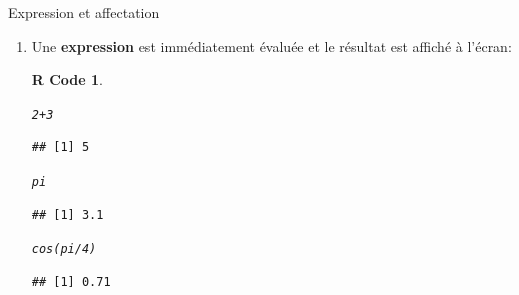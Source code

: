 \documentclass[11pt]{beamer}\usepackage[]{graphicx}\usepackage[]{color}
\makeatletter
\newcommand{\hlnum}[1]{\textcolor[rgb]{0.063,0.58,0.627}{#1}}%
\newcommand{\hlopt}[1]{\textcolor[rgb]{0.196,0.196,0.196}{#1}}%
\newcommand{\hlstd}[1]{\textcolor[rgb]{0.196,0.196,0.196}{#1}}%
\newcommand{\hlkwd}[1]{\textcolor[rgb]{0.78,0.227,0.412}{#1}}%
\newenvironment{kframe}{%
 \def\at@end@of@kframe{}%
 \ifinner\ifhmode%
  \def\at@end@of@kframe{\end{minipage}}%
  \begin{minipage}{\columnwidth}%
 \fi\fi%
 \def\FrameCommand##1{\hskip\@totalleftmargin \hskip-\fboxsep
 \colorbox{shadecolor}{##1}\hskip-\fboxsep
     \hskip-\linewidth \hskip-\@totalleftmargin \hskip\columnwidth}%
 \MakeFramed {\advance\hsize-\width
   \@totalleftmargin\z@ \linewidth\hsize
   \@setminipage}}%
 {\par\unskip\endMakeFramed%
 \at@end@of@kframe}
\newenvironment{knitrout}{}{} %
\newtheorem{rcode}{R Code}[section]
\newcounter{saveenumi}
\newcommand{\seti}{\setcounter{saveenumi}{\value{enumi}}}
\makeatother
\begin{document}
\begin{frame}[fragile]{Expression et affectation} 
\begin{enumerate}
\item Une \textbf{expression} est immédiatement évaluée et le résultat est affiché à l’écran:
\pause
\begin{knitrout}
\color{fgcolor}\begin{kframe}
\begin{rcode}\label{unnamed-chunk-9}\hfill{}\begin{alltt}
\hlnum{2} \hlopt{+} \hlnum{3}
\end{alltt}
\begin{verbatim}
## [1] 5
\end{verbatim}
\begin{alltt}
\hlstd{pi}
\end{alltt}
\begin{verbatim}
## [1] 3.1
\end{verbatim}
\begin{alltt}
\hlkwd{cos}\hlstd{(pi}\hlopt{/}\hlnum{4}\hlstd{)}
\end{alltt}
\begin{verbatim}
## [1] 0.71
\end{verbatim}
\end{rcode}\end{kframe}
\end{knitrout}
\seti
\end{enumerate}

\end{frame}
\end{document}
